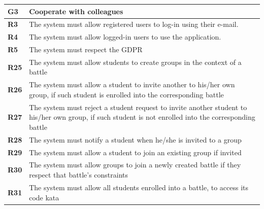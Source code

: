 \documentclass[../RASD.tex]{subfiles}
\begin{document}
        \begin{table}[h!]
            \begin{center}
                \begin{tabular}{|m{2em}|m{30em}|}
                \hline
                \rowcolor{ReqMappingRow1}
                \textbf{G3} & \textbf{Cooperate with colleagues}\\
                \hline
                \cellcolor{ReqMappingCell2}
                \textbf{R3} & The system must allow registered users to log-in using their e-mail.\\
                \hline
                \cellcolor{ReqMappingCell2}
                \textbf{R4} & The system must allow logged-in users to use the application.\\
                \hline
                \cellcolor{ReqMappingCell2}
                \textbf{R5} & The system must respect the GDPR\\
                \hline
                \cellcolor{ReqMappingCell2}
                \textbf{R25} & The system must allow students to create groups in the context of a battle\\
                \hline
                \cellcolor{ReqMappingCell2}
                \textbf{R26} & The system must allow a student to invite another to his/her own group, if such student is enrolled into the corresponding battle\\
                \hline
                \cellcolor{ReqMappingCell2}
                \textbf{R27} & The system must reject a student request to invite another student to his/her own group, if such student is not enrolled into the corresponding battle\\
                \hline
                \cellcolor{ReqMappingCell2}
                \textbf{R28} & The system must notify a student when he/she is invited to a group\\
                \hline
                \cellcolor{ReqMappingCell2}
                \textbf{R29} & The system must allow a student to join an existing group if invited\\
                \hline
                \cellcolor{ReqMappingCell2}
                \textbf{R30} & The system must allow groups to join a newly created battle if they respect that battle's constraints\\
                \hline
                \cellcolor{ReqMappingCell2}
                \textbf{R31} & The system must allow all students enrolled into a battle, to access its code kata\\

\end{tabular}
\end{center}
\end{table}
\end{document}
